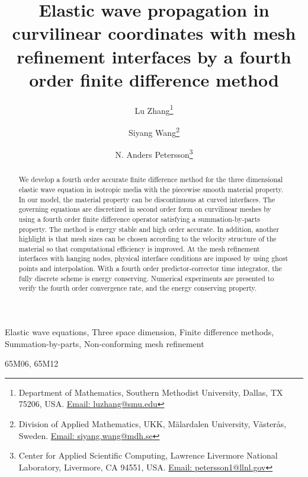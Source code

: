 \documentclass[review,onefignum,onetabnum]{siamart171218}
\title{Elastic wave propagation in curvilinear coordinates with mesh refinement interfaces by a fourth order finite difference method}
\begin{document}
\author{Lu Zhang\thanks{Department of Mathematics, Southern Methodist University, Dallas, TX 75206, USA. \href{mailto:luzhang@smu.edu}{Email: luzhang@smu.edu}}\and Siyang Wang\thanks{Division of Applied Mathematics, UKK, M\"alardalen University, V\"aster\aa s, 
    Sweden. \href{mailto:siyang.wang@mdh.se}{Email: siyang.wang@mdh.se}}\and N. Anders
  Petersson\thanks{Center for Applied Scientific Computing, Lawrence Livermore National Laboratory,
    Livermore, CA 94551, USA. \href{mailto:petersson1@llnl.gov}{Email: petersson1@llnl.gov}}}
\maketitle


\begin{abstract}
We develop a fourth order accurate finite difference method for the three dimensional elastic wave equation in isotropic media with the piecewise smooth material property. In our model, the material property can be discontinuous at curved interfaces. The governing equations are discretized in second order form on curvilinear meshes by using a fourth order finite difference operator satisfying a summation-by-parts property. The method is energy stable and high order accurate. In addition, another highlight is that mesh sizes can be chosen according to the velocity structure of the material so that computational efficiency is improved. At the mesh refinement interfaces with hanging nodes, physical interface conditions are imposed by using ghost points and interpolation.  With a fourth order predictor-corrector time integrator, the fully discrete scheme is energy conserving. Numerical experiments are presented to verify the fourth order convergence rate, and the energy conserving property. 
\end{abstract}

\begin{keywords}
Elastic wave equations, Three space dimension,  Finite difference methods, Summation-by-parts, Non-conforming mesh refinement
\end{keywords}

\begin{AMS}
  65M06, 65M12
\end{AMS}






























\end{document}
